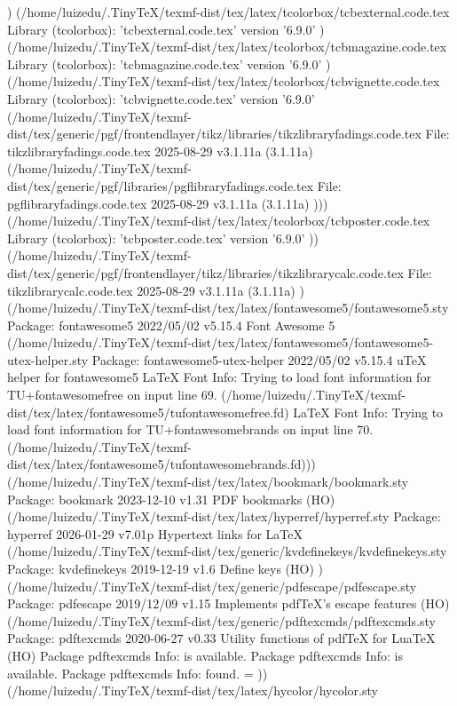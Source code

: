 ) (/home/luizedu/.TinyTeX/texmf-dist/tex/latex/tcolorbox/tcbexternal.code.tex
Library (tcolorbox): 'tcbexternal.code.tex' version '6.9.0'
) (/home/luizedu/.TinyTeX/texmf-dist/tex/latex/tcolorbox/tcbmagazine.code.tex
Library (tcolorbox): 'tcbmagazine.code.tex' version '6.9.0'
) (/home/luizedu/.TinyTeX/texmf-dist/tex/latex/tcolorbox/tcbvignette.code.tex
Library (tcolorbox): 'tcbvignette.code.tex' version '6.9.0'
(/home/luizedu/.TinyTeX/texmf-dist/tex/generic/pgf/frontendlayer/tikz/libraries/tikzlibraryfadings.code.tex
File: tikzlibraryfadings.code.tex 2025-08-29 v3.1.11a (3.1.11a)
(/home/luizedu/.TinyTeX/texmf-dist/tex/generic/pgf/libraries/pgflibraryfadings.code.tex
File: pgflibraryfadings.code.tex 2025-08-29 v3.1.11a (3.1.11a)
))) (/home/luizedu/.TinyTeX/texmf-dist/tex/latex/tcolorbox/tcbposter.code.tex
Library (tcolorbox): 'tcbposter.code.tex' version '6.9.0'
)) (/home/luizedu/.TinyTeX/texmf-dist/tex/generic/pgf/frontendlayer/tikz/libraries/tikzlibrarycalc.code.tex
File: tikzlibrarycalc.code.tex 2025-08-29 v3.1.11a (3.1.11a)
) (/home/luizedu/.TinyTeX/texmf-dist/tex/latex/fontawesome5/fontawesome5.sty
Package: fontawesome5 2022/05/02 v5.15.4 Font Awesome 5
(/home/luizedu/.TinyTeX/texmf-dist/tex/latex/fontawesome5/fontawesome5-utex-helper.sty
Package: fontawesome5-utex-helper 2022/05/02 v5.15.4 uTeX helper for fontawesome5
LaTeX Font Info:    Trying to load font information for TU+fontawesomefree on input line 69.
(/home/luizedu/.TinyTeX/texmf-dist/tex/latex/fontawesome5/tufontawesomefree.fd)
LaTeX Font Info:    Trying to load font information for TU+fontawesomebrands on input line 70.
(/home/luizedu/.TinyTeX/texmf-dist/tex/latex/fontawesome5/tufontawesomebrands.fd))) (/home/luizedu/.TinyTeX/texmf-dist/tex/latex/bookmark/bookmark.sty
Package: bookmark 2023-12-10 v1.31 PDF bookmarks (HO)
(/home/luizedu/.TinyTeX/texmf-dist/tex/latex/hyperref/hyperref.sty
Package: hyperref 2026-01-29 v7.01p Hypertext links for LaTeX
(/home/luizedu/.TinyTeX/texmf-dist/tex/generic/kvdefinekeys/kvdefinekeys.sty
Package: kvdefinekeys 2019-12-19 v1.6 Define keys (HO)
) (/home/luizedu/.TinyTeX/texmf-dist/tex/generic/pdfescape/pdfescape.sty
Package: pdfescape 2019/12/09 v1.15 Implements pdfTeX's escape features (HO)
(/home/luizedu/.TinyTeX/texmf-dist/tex/generic/pdftexcmds/pdftexcmds.sty
Package: pdftexcmds 2020-06-27 v0.33 Utility functions of pdfTeX for LuaTeX (HO)
Package pdftexcmds Info: \pdf@primitive is available.
Package pdftexcmds Info: \pdf@ifprimitive is available.
Package pdftexcmds Info: \pdfdraftmode found.
\pdftexcmds@toks=
)) (/home/luizedu/.TinyTeX/texmf-dist/tex/latex/hycolor/hycolor.sty
